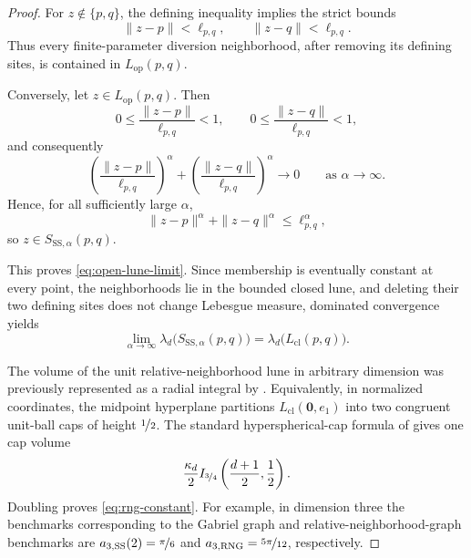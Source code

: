\documentclass[a4paper,fleqn]{cas-dc}
\theoremstyle{definition}
\theoremstyle{remark}
\newcommand{\0}{\mathbf{0}}
\begin{document}
\begin{proof}
For $z\notin\{p,q\}$, the defining inequality implies the strict bounds
\begin{equation}
\|z-p\|< \ell_{p,q},
\qquad
\|z-q\|< \ell_{p,q}.
\end{equation}
Thus every finite-parameter diversion neighborhood, after removing its defining
sites, is contained in $L_{\mathrm{op}}(p,q)$.

Conversely, let \(z\in L_{\mathrm{op}}(p,q)\). Then
\begin{equation}
0\leq \frac{\|z-p\|}{\ell_{p,q}}<1,
\qquad
0\leq \frac{\|z-q\|}{\ell_{p,q}}<1,
\end{equation}
and consequently
\begin{equation}
\left(\frac{\|z-p\|}{\ell_{p,q}}\right)^\alpha
+
\left(\frac{\|z-q\|}{\ell_{p,q}}\right)^\alpha
\longrightarrow 0
\qquad\text{as }\alpha\to\infty.
\end{equation}
Hence, for all sufficiently large \(\alpha\),
\begin{equation}
\|z-p\|^\alpha+\|z-q\|^\alpha
\leq \ell_{p,q}^\alpha,
\end{equation}
so \(z\in S_{\mathrm{SS},\alpha}(p,q)\).

This proves \eqref{eq:open-lune-limit}. Since membership is eventually
constant at every point, the neighborhoods lie in the bounded closed lune,
and deleting their two defining sites does not change Lebesgue measure,
dominated convergence yields
\begin{equation}
    \lim_{\alpha\to\infty}
    \lambda_d\bigl(S_{\mathrm{SS},\alpha}(p,q)\bigr)
    =
    \lambda_d\bigl(L_{\mathrm{cl}}(p,q)\bigr).
\end{equation}

The volume of the unit relative-neighborhood lune in arbitrary dimension was
previously represented as a radial integral by
\citet[Sec.~5, p.~59]{devroye1988expected}. Equivalently, in normalized
coordinates, the midpoint hyperplane partitions
$L_{\mathrm{cl}}(\0,e_1)$ into two congruent unit-ball caps of height $\nicefrac{1}{2}$.
The standard hyperspherical-cap formula of \citet{li2011concise} gives one cap
volume
\begin{equation}
\frac{\kappa_d}{2}
I_{\nicefrac{3}{4}}\left(\frac{d+1}{2},\frac12\right).
\end{equation}
Doubling proves \eqref{eq:rng-constant}. For example, in dimension three the benchmarks corresponding to the Gabriel graph and relative-neighborhood-graph benchmarks are $a_{3,\mathrm{SS}}(2)=\nicefrac{\pi}{6}$ and
$a_{3,\mathrm{RNG}}=\nicefrac{5\pi}{12}$, respectively.
\end{proof}
\end{document}
